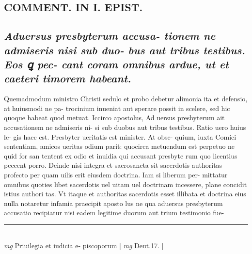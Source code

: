 \documentclass{article}
\begin{document}
\begin{pages}
\section*{COMMENT. IN I. EPIST. }
{}
\subsection*{\textit{Aduersus presbyterum accusa- tionem ne admiseris nisi sub duo- bus aut tribus testibus. Eos ꝗ pec- cant coram omnibus ardue, ut et caeteri timorem habeant. }}\pstart Quemadmodum ministro Christi sedulo et probo debetur alimonia ita et defensio, at huiusmodi ne pa- trocinium inueniat aut sperare possit in scelere, sed hic quoque habeat quod metuat. Iccirco apostolus, Ad uersus presbyterum ait accusationem ne admiseris ni- si sub duobus aut tribus testibus. Ratio uero huius le- gis haec est. Presbyter ueritatis est minister. At obse- quium, iuxta Comici sententiam, amicos ueritas odium parit: quocirca metuendum est perpetuo ne quid for san tentent ex odio et inuidia qui accusant presbyte rum quo licentius peccent porro. Deinde nisi integra et sacrosancta sit sacerdotis authoritas profecto per quam uilis erit eiusdem doctrina. Iam si liberum per- mittatur omnibus quoties libet sacerdotis uel uitam uel doctrinam incessere, plane concidit istius authori tas. Vt itaque et authoritas sacerdotis esset illibata et doctrina eius nulla notaretur infamia praecipit aposto lus ne qua aduersus presbyterum accusatio recipiatur nisi eadem legitime duorum aut trium testimonio fue-  \pend
\vspace{0.5cm}\noindent
\vspace{0.2cm}\rule{1cm}{0.2pt}\\ 
\hspace{0.2cm}\textit{mg}
\footnotesize Priuilegia et iudicia e- piscoporum 
\normalsize| 
\hspace{0.2cm}\textit{mg}
\footnotesize Deut.17. 
\normalsize| 

\end{pages}
\end{document}
